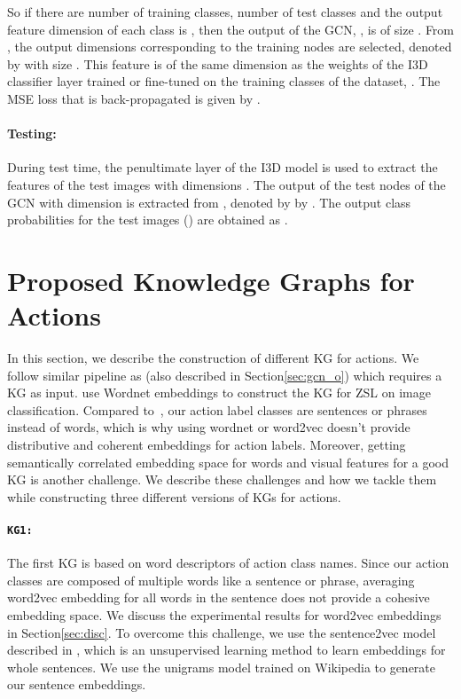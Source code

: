 So if there are  number of training classes,  number of test classes and the output feature dimension of each class is , then the output of the GCN, , is of size . From , the output dimensions corresponding to the training nodes are selected, denoted by  with size . This feature is of the same dimension as the weights of the I3D classifier layer trained or fine-tuned on the training classes of the dataset, . The MSE loss that is back-propagated is given by .


\paragraph{\bf Testing:} 
During test time, the penultimate layer of the I3D model is used to extract the features of the test images  with dimensions . The output of the test nodes of the GCN with dimension  is extracted from , denoted by by . The output class probabilities for the test images () are obtained as .

\section{Proposed Knowledge Graphs for Actions}
\label{sec:akg}

In this section, we describe the construction of different KG for actions. We follow similar pipeline as \cite{wang2018zero} (also described in Section\ref{sec:gcn_o}) which requires a KG as input. \cite{wang2018zero} use Wordnet embeddings to construct the KG for ZSL on image classification. Compared to~\cite{wang2018zero}, our action label classes are sentences or phrases instead of words, which is why using wordnet or word2vec doesn't provide distributive and coherent embeddings for action labels. Moreover, getting semantically correlated embedding space for words and visual features for a good KG is another challenge. We describe these challenges and how we tackle them while constructing three different versions of KGs for actions.

\paragraph{\texttt{\bf {KG1:}}} The first KG is based on word descriptors of action class names. Since our action classes are composed of multiple words like a sentence or phrase, averaging word2vec embedding for all words in the sentence does not provide a cohesive embedding space. We discuss the experimental results for word2vec embeddings in Section\ref{sec:disc}. To overcome this challenge, we use the sentence2vec model described in \cite{pagliardini2017unsupervised}, which is an unsupervised learning method to learn embeddings for whole sentences. We use the unigrams model trained on Wikipedia to generate our sentence embeddings. 

